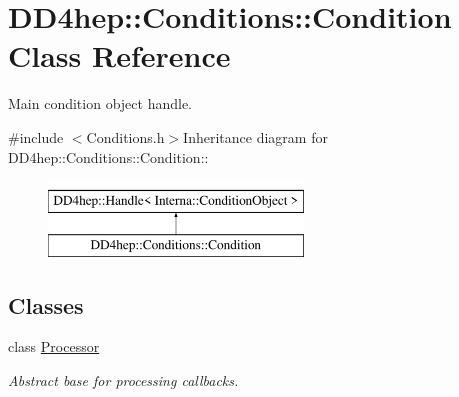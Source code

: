 \hypertarget{class_d_d4hep_1_1_conditions_1_1_condition}{
\section{DD4hep::Conditions::Condition Class Reference}
\label{class_d_d4hep_1_1_conditions_1_1_condition}
}


Main condition object handle.  


{\ttfamily \#include $<$Conditions.h$>$}Inheritance diagram for DD4hep::Conditions::Condition::\begin{figure}[H]
\begin{center}
\leavevmode
\includegraphics[height=2cm]{class_d_d4hep_1_1_conditions_1_1_condition}
\end{center}
\end{figure}
\subsection*{Classes}
\begin{DoxyCompactItemize}
\item 
class \hyperlink{class_d_d4hep_1_1_conditions_1_1_condition_1_1_processor}{Processor}
\begin{DoxyCompactList}\small\item\em Abstract base for processing callbacks. \item\end{DoxyCompactList}\end{DoxyCompactItemize}
